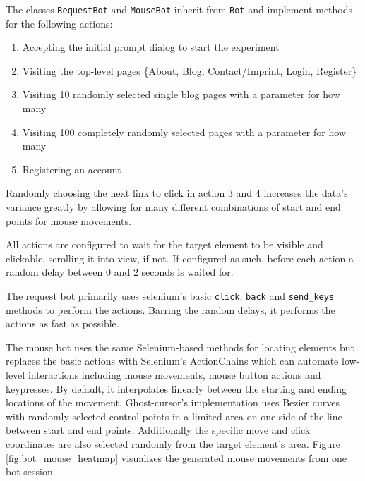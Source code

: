 \documentclass[
    fontsize=12pt,
    headings=small,
    parskip=half,           %
    bibliography=totoc,
    numbers=noenddot,       %
    open=any,               %
    final,                   %
    table
]{scrreprt}
\begin{document}
The classes \lstinline{RequestBot} and \lstinline{MouseBot} inherit from \lstinline{Bot} and implement methods for the following actions:

\begin{enumerate}
    \item Accepting the initial prompt dialog to start the experiment
    \item Visiting the top-level pages \{About, Blog, Contact/Imprint, Login, Register\}
    \item Visiting 10 randomly selected single blog pages with a parameter for how many
    \item Visiting 100 completely randomly selected pages with a parameter for how many
    \item Registering an account
\end{enumerate}

Randomly choosing the next link to click in action 3 and 4 increases the data's variance greatly by allowing for many different combinations of start and end points for mouse movements.

All actions are configured to wait for the target element to be visible and clickable, scrolling it into view, if not. If configured as such, before each action a random delay between $0$ and $2$ seconds is waited for.

The request bot primarily uses selenium's basic \lstinline{click}, \lstinline{back} and \lstinline{send_keys} methods to perform the actions. Barring the random delays, it performs the actions as fast as possible.


The mouse bot uses the same Selenium-based methods for locating elements but replaces the basic actions with Selenium's ActionChains which can automate low-level interactions including mouse movements, mouse button actions and keypresses. By default, it interpolates linearly between the starting and ending locations of the movement. Ghost-cursor's implementation uses Bezier curves with randomly selected control points in a limited area on one side of the line between start and end points. Additionally the specific move and click coordinates are also selected randomly from the target element's area. Figure \ref{fig:bot_mouse_heatmap} visualizes the generated mouse movements from one bot session.
\end{document}
